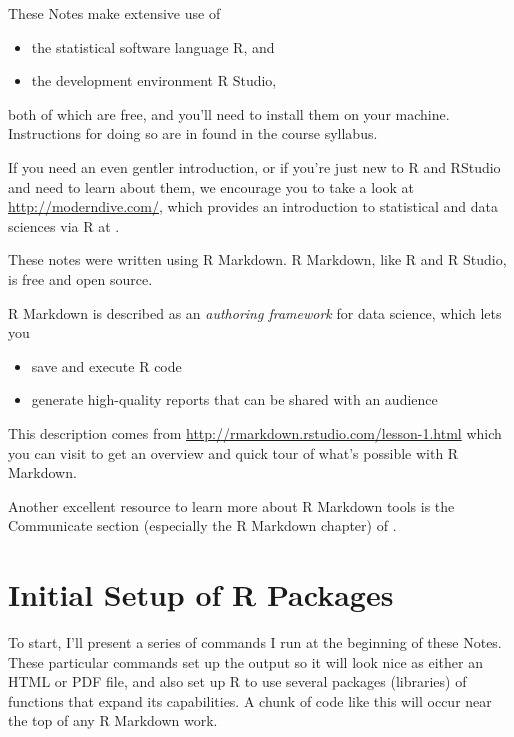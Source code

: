 \documentclass[
]{book}
\providecommand{\tightlist}{%
  \setlength{\itemsep}{0pt}\setlength{\parskip}{0pt}}
\begin{document}
These Notes make extensive use of

\begin{itemize}
\tightlist
\item
  the statistical software language R, and
\item
  the development environment R Studio,
\end{itemize}

both of which are free, and you'll need to install them on your machine. Instructions for doing so are in found in the course syllabus.

If you need an even gentler introduction, or if you're just new to R and RStudio and need to learn about them, we encourage you to take a look at \url{http://moderndive.com/}, which provides an introduction to statistical and data sciences via R at \citet{ModernDive}.

These notes were written using R Markdown. R Markdown, like R and R Studio, is free and open source.

R Markdown is described as an \emph{authoring framework} for data science, which lets you

\begin{itemize}
\tightlist
\item
  save and execute R code
\item
  generate high-quality reports that can be shared with an audience
\end{itemize}

This description comes from \url{http://rmarkdown.rstudio.com/lesson-1.html} which you can visit to get an overview and quick tour of what's possible with R Markdown.

Another excellent resource to learn more about R Markdown tools is the Communicate section (especially the R Markdown chapter) of \citet{R4DS}.

\hypertarget{initial-setup-of-r-packages}{%
\section*{Initial Setup of R Packages}\label{initial-setup-of-r-packages}}

To start, I'll present a series of commands I run at the beginning of these Notes. These particular commands set up the output so it will look nice as either an HTML or PDF file, and also set up R to use several packages (libraries) of functions that expand its capabilities. A chunk of code like this will occur near the top of any R Markdown work.
\end{document}
